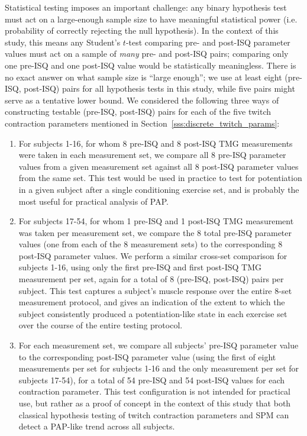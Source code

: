 \documentclass[utf8]{FrontiersinHarvard}
\begin{document}
Statistical testing imposes an important challenge:
any binary hypothesis test must act on a large-enough sample size to have meaningful statistical power (i.e. probability of correctly rejecting the null hypothesis).
In the context of this study, this means any Student's $ t $-test comparing pre- and post-ISQ parameter values must act on a sample of \textit{many} pre- and post-ISQ pairs; comparing only one pre-ISQ and one post-ISQ value would be statistically meaningless.
There is no exact answer on what sample size is ``large enough''; we use at least eight (pre-ISQ, post-ISQ) pairs for all hypothesis tests in this study, while five pairs might serve as a tentative lower bound.
We considered the following three ways of constructing testable (pre-ISQ, post-ISQ) pairs for each of the five twitch contraction parameters mentioned in Section~\ref{sss:discrete_twitch_params}:
\begin{enumerate}

    \item For subjects 1-16, for whom 8 pre-ISQ and 8 post-ISQ TMG measurements were taken in each measurement set, we compare all 8 pre-ISQ parameter values from a given measurement set against all 8 post-ISQ parameter values from the same set.
    This test would be used in practice to test for potentiation in a given subject after a single conditioning exercise set, and is probably the most useful for practical analysis of PAP.

    \item For subjects 17-54, for whom 1 pre-ISQ and 1 post-ISQ TMG measurement was taken per measurement set, we compare the 8 total pre-ISQ parameter values (one from each of the 8 measurement sets) to the corresponding 8 post-ISQ parameter values.
    We perform a similar cross-set comparison for subjects 1-16, using only the first pre-ISQ and first post-ISQ TMG measurement per set, again for a total of 8 (pre-ISQ, post-ISQ) pairs per subject.
    This test captures a subject's muscle response over the entire 8-set measurement protocol, and gives an indication of the extent to which the subject consistently produced a potentiation-like state in each exercise set over the course of the entire testing protocol.

    \item For each measurement set, we compare all subjects' pre-ISQ parameter value to the corresponding post-ISQ parameter value (using the first of eight measurements per set for subjects 1-16 and the only measurement per set for subjects 17-54), for a total of 54 pre-ISQ and 54 post-ISQ values for each contraction parameter.
    This test configuration is not intended for practical use, but rather as a proof of concept in the context of this study that both classical hypothesis testing of twitch contraction parameters and SPM can detect a PAP-like trend across all subjects.

\end{enumerate}
\end{document}

